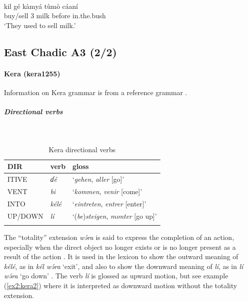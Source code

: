 \ea\label{ex2:lele12}
 \\
\gll kil	gé	kàmyá	tùmò	cáaní \\
buy/sell	3	milk	before	in.the.bush \\
\glt `They used to sell milk.'
\z

\subsection{East Chadic A3 (2/2)}

\paragraph*{Kera (kera1255)} \label{kera}

Information on Kera grammar is from a reference grammar \citep{ebertSpracheUndTradition1976}. 

\subparagraph{Directional verbs}~

\begin{table}[H]
	\caption{Kera directional verbs} 
	\label{tab:keraV}
	\begin{tabular}{lll} %
		\lsptoprule
		DIR & verb & gloss   \\ %
		\midrule
		ITIVE & \textit{ɗé} & `\textit{gehen}, \textit{aller} [go]' \\
		VENT & \textit{bi} & `\textit{kommen}, \textit{venir} [come]' \\
		INTO & \textit{kélé} & `\textit{eintreten}, \textit{entrer} [enter]'\\
		UP/DOWN & \textit{lí} & `(\textit{be})\textit{steigen}, \textit{monter} [go up]' \\
		\lspbottomrule
	\end{tabular}
\end{table}

The ``totality'' extension \textit{wə́ra} is said to express the completion of an action, especially when the direct object no longer exists or is no longer present as a result of the action \citep[111]{ebertSpracheUndTradition1979}. It is used in the lexicon to show the outward meaning of \textit{kélé}, as in \textit{kél wə́ra} `exit', and also to show the downward meaning of \textit{lí}, as in \textit{lí wə́ra} `go down' \citep{ebertSpracheUndTradition1976}. The verb \textit{lí} is glossed as upward motion, but see example (\ref{ex2:kera2}) where it is interpreted as downward motion without the totality extension.

